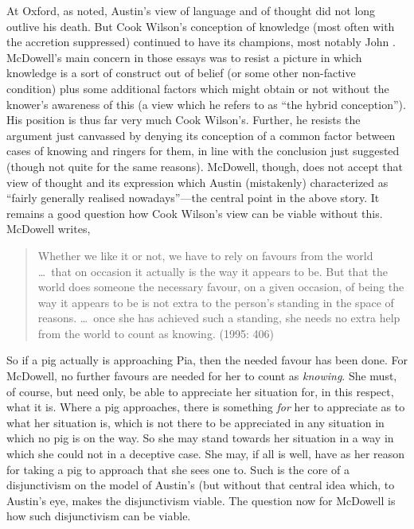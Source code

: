 At Oxford, as noted, Austin's view of language and of thought did not long outlive his death. But Cook Wilson's conception of knowledge (most often with the accretion suppressed) continued to have its champions, most notably John \citet[]{McDowell:1982kx,McDowell:1994am}. McDowell's main concern in those essays was to resist a picture in which knowledge is a sort of construct out of belief (or some other non-factive condition) plus some additional factors which might obtain or not without the knower's awareness of this (a view which he refers to as ``the hybrid conception''). His position is thus far very much Cook Wilson's. Further, he resists the argument just canvassed by denying its conception of a common factor between cases of knowing and ringers for them, in line with the conclusion just suggested (though not quite for the same reasons). McDowell, though, does not accept that view of thought and its expression which Austin (mistakenly) characterized as ``fairly generally realised nowadays''---the central point in the above story. It remains a good question how Cook Wilson’s view can be viable without this. McDowell writes,
\begin{quote}
	Whether we like it or not, we have to rely on favours from the world \ldots\ that on occasion it actually is the way it appears to be. But that the world does someone the necessary favour, on a given occasion, of being the way it appears to be is not extra to the person’s standing in the space of reasons. \ldots\ once she has achieved such a standing, she needs no extra help from the world to count as knowing. (1995: 406)
\end{quote}
So if a pig actually is approaching Pia, then the needed favour has been done. For McDowell, no further favours are needed for her to count as \emph{knowing}. She must, of course, but need only, be able to appreciate her situation for, in this respect, what it is. Where a pig approaches, there is something \emph{for} her to appreciate as to what her situation is, which is not there to be appreciated in any situation in which no pig is on the way. So she may stand towards her situation in a way in which she could not in a deceptive case. She may, if all is well, have as her reason for taking a pig to approach that she sees one to. Such is the core of a disjunctivism on the model of Austin's (but without that central idea which, to Austin’s eye, makes the disjunctivism viable. The question now for McDowell is how such disjunctivism can be viable.

